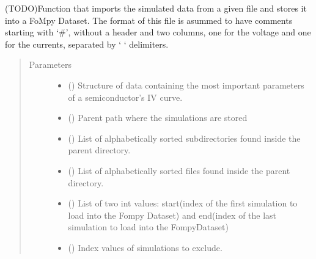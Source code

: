 \documentclass[letterpaper,10pt,english,openany, oneside]{sphinxmanual}
\begin{document}
\begin{fulllineitems}
\label{\detokenize{index:fompy.fds.default}}
(TODO)Function that imports the simulated data from a given file and
stores it into a FoMpy Dataset. The format of this file is asummed to have comments
starting with ‘\#’, without a header and two columns, one for the voltage and one for the currents, separated
by ‘    ‘ delimiters.
\begin{quote}\begin{description}
\item[{Parameters}] \leavevmode\begin{itemize}
\item {} 
 () \textendash{} Structure of data containing the most important parameters of a semiconductor’s IV curve.

\item {} 
 () \textendash{} Parent path where the simulations are stored

\item {} 
 () \textendash{} List of alphabetically sorted subdirectories found inside the parent directory.

\item {} 
 () \textendash{} List of alphabetically sorted files found inside the parent directory.

\item {} 
 () \textendash{} List of two int values: start(index of the first simulation to load into the Fompy Dataset)
and end(index of the last simulation to load into the FompyDataset)

\item {} 
 () \textendash{} Index values of simulations to exclude.


\end{itemize}
\end{description}
\end{quote}
\end{fulllineitems}
\end{document}
